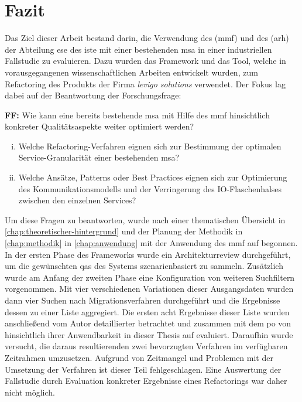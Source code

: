 \chapter{Fazit}
\label{chap:fazit}

Das Ziel dieser Arbeit bestand darin, die Verwendung des  (\acrshort{mmf}) und des  (\acrshort{arh}) der Abteilung \acrfull{ese} des \acrfull{iste} mit einer bestehenden \acrfull{msa} in einer industriellen Fallstudie zu evaluieren.
Dazu wurden das Framework und das Tool, welche in vorausgegangenen wissenschaftlichen Arbeiten entwickelt wurden, zum Refactoring des Produkts \jf der Firma \emph{levigo solutions} verwendet.
Der Fokus lag dabei auf der Beantwortung der Forschungsfrage:

\textbf{FF:} Wie kann eine bereits bestehende \acrlong{msa} mit Hilfe des \acrfull{mmf} hinsichtlich konkreter Qualitätsaspekte weiter optimiert werden?
\begin{enumerate}[i.]
	\item Welche Refactoring-Verfahren eignen sich zur Bestimmung der optimalen Service-Granularität einer bestehenden \acrlong{msa}?
	\item Welche Ansätze, Patterns oder Best Practices eignen sich zur Optimierung des Kom\-mu\-ni\-ka\-tions\-mo\-dells und der Verringerung des IO-Flaschenhalses zwischen den einzelnen Services?
\end{enumerate}

Um diese Fragen zu beantworten, wurde nach einer thematischen Übersicht in \cref{chap:theoretischer-hintergrund} und der Planung der Methodik in \cref{chap:methodik} in \cref{chap:anwendung} mit der Anwendung des \gls{mmf} auf \jf begonnen.
In der ersten Phase des Frameworks wurde ein Architekturreview durchgeführt, um die gewünschten \glspl{qa} des Systems szenarienbasiert zu sammeln.
Zusätzlich wurde am Anfang der zweiten Phase eine Konfiguration von weiteren Suchfiltern vorgenommen.
Mit vier verschiedenen Variationen dieser Ausgangsdaten wurden dann vier Suchen nach Migrationsverfahren durchgeführt und die Ergebnisse dessen zu einer Liste aggregiert.
Die ersten acht Ergebnisse dieser Liste wurden anschließend vom Autor detaillierter betrachtet und zusammen mit dem \gls{po} von \jf hinsichtlich ihrer Anwendbarkeit in dieser Thesis auf \jf evaluiert.
Daraufhin wurde versucht, die daraus resultierenden zwei bevorzugten Verfahren im verfügbaren Zeitrahmen umzusetzen.
Aufgrund von Zeitmangel und Problemen mit der Umsetzung der Verfahren ist dieser Teil fehlgeschlagen.
Eine Auswertung der Fallstudie durch Evaluation konkreter Ergebnisse eines Refactorings war daher nicht möglich.

